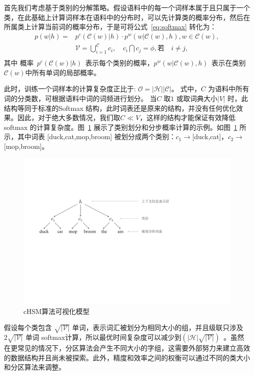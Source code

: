 首先我们考虑基于类别的分解策略。假设语料中的每一个词样本属于且只属于一个类，在此基础上计算词样本在语料中的分布时，可以先计算类的概率分布，然后在所属类上计算当前词的概率分布，于是可将公式~\ref{eq:softmax} 转化为：
  \begin{equation}
  \begin{split}
p(w|h)=&p^c(\mathcal{C}(w)|h)\cdot p^w(w|\mathcal{C}(w),h) , w\in \mathcal{C}(w),\\
&\mathcal{V}=\bigcup _{i = 1}^\mathcal{C}{c_i},\quad  c_i \bigcap c_j=\phi, \text{若}\quad i\ne j, \\
\end{split}
\end{equation}
其中 概率~$p^c(\mathcal{C}(w)|h)$~表示每个类别的概率，$p^w(w|\mathcal{C}(w),h)$~表示在类别$\mathcal{C}(w)$中所有单词的局部概率。

此时，训练一个词样本的计算复杂度正比于: $\mathcal{O =|H||C|}$。 式中，$C$ 为语料中所有词的分类数，可根据语料中词的词频进行划分。 当$C$ 取$1$ 或取词典大小$|V|$ 时，此结构等同于标准的Softmax 结构，此时词表还是原来的结构，并没有任何优化效果。因此，对于绝大多数情况，我们取$C \ll V$，这样的结构才能保证有效降低 softmax 的计算复杂度。图~\ref{fig:case_hsm} 展示了类别划分和分步概率计算的示例。如图~\ref{fig:case_hsm} 所示，其中词表 [duck,cat,mop,broom] 被划分成两个类别：$c_1\to$[duck,cat]，$c_2\to$[mop,broom]。
\begin{figure}[!h]
  \centering
\includegraphics[width=0.79\linewidth]{./figures/case_chsm.pdf}
\caption{cHSM算法可视化模型}\label{fig:case_hsm}
\end{figure}

假设每个类包含 $\sqrt{\mathcal{|V|}}$ 单词，表示词汇被划分为相同大小的组，并且级联只涉及$2\sqrt{\mathcal{|V|}}$ 单词 softmax计算，所以最优时间复杂度可以减少到$(\mathcal{|H|}\sqrt{\mathcal{|V|}})$~。虽然在更常见的情况下，分区算法会产生不同大小的字组，这需要外部努力来建立高效的数据结构并且尚未被探索。此外，精度和效率之间的权衡可以通过不同的类大小和分区算法来调整。

